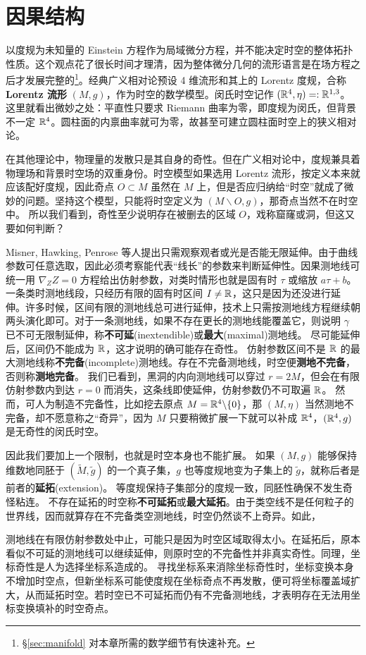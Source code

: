\section{因果结构}\label{sec:causal}

以度规为未知量的 Einstein 方程作为局域微分方程，并不能决定时空的整体拓扑性质。这个观点花了很长时间才理清，因为整体微分几何的流形语言是在场方程之后才发展完整的\footnote{\S\ref{sec:manifold} 对本章所需的数学细节有快速补充。}。经典广义相对论预设 4 维流形和其上的 Lorentz 度规，合称\textbf{Lorentz 流形} $(M,g)$，作为时空的数学模型。闵氏时空记作 $(\mathbb{R}^4,\eta)=:\mathbb{R}^{1,3}$。
这里就看出微妙之处：平直性只要求 Riemann 曲率为零，即度规为闵氏，但背景不一定 $\mathbb{R}^4$。圆柱面的内禀曲率就可为零，故甚至可建立圆柱面时空上的狭义相对论。

在其他理论中，物理量的发散只是其自身的奇性。但在广义相对论中，度规兼具着物理场和背景时空场的双重身份。时空模型如果选用 Lorentz 流形，按定义本来就应该配好度规，因此奇点 $O\subset M$ 虽然在 $M$ 上，但是否应归纳给“时空”就成了微妙的问题。坚持这个模型，只能将时空定义为 $(M\backslash O,g)$，那奇点当然不在时空中。
所以我们看到，奇性至少说明存在被删去的区域 $O$，戏称窟窿或洞，但这又要如何判断？

Misner, Hawking, Penrose 等人提出只需观察观者或光是否能无限延伸。由于曲线参数可任意选取，因此必须考察能代表“线长”的参数来判断延伸性。因果测地线可统一用 $\nabla_Z Z = 0$ 方程给出仿射参数，对类时情形也就是固有时 $\tau$ 或缩放 $a\tau + b$。
一条类时测地线段，只经历有限的固有时区间 $I\ne \mathbb{R}$，这只是因为还没进行延伸。许多时候，区间有限的测地线总可进行延伸，技术上只需按测地线方程继续朝两头演化即可。对于一条测地线，如果不存在更长的测地线能覆盖它，则说明 $\gamma$ 已不可无限制延伸，称\textbf{不可延}(inextendible)或\textbf{最大}(maximal)测地线。
尽可能延伸后，区间仍不能成为 $\mathbb{R}$，这才说明的确可能存在奇性。
仿射参数区间不是 $\mathbb{R}$ 的最大测地线称\textbf{不完备}(incomplete)测地线。存在不完备测地线，时空便\textbf{测地不完备}，否则称\textbf{测地完备}。
我们已看到，黑洞的内向测地线可以穿过 $r=2M$，但会在有限仿射参数内到达 $r=0$ 而消失，这条线即使延伸，仿射参数仍不可取遍 $\mathbb{R}$。
然而，可人为制造不完备性，比如挖去原点 $M=\mathbb{R}^4\backslash\{0\}$，那 $(M,\eta)$ 当然测地不完备，却不愿意称之“奇异”，因为 $M$ 只要稍微扩展一下就可以补成 $\mathbb{R}^4$，$(\mathbb{R}^4,g)$ 是无奇性的闵氏时空。

因此我们要加上一个限制，也就是时空本身也不能扩展。
如果 $(M,g)$ 能够保持维数地同胚于 $(\widetilde{M},\tilde g)$ 的一个真子集，$g$ 也等度规地变为子集上的 $\tilde g$，就称后者是前者的\textbf{延拓}(extension)。
等度规保持子集部分的度规一致，同胚性确保不发生奇怪粘连。
不存在延拓的时空称\textbf{不可延拓}或\textbf{最大延拓}。由于类空线不是任何粒子的世界线，因而就算存在不完备类空测地线，时空仍然谈不上奇异。如此，
\begin{center}
\end{center}
测地线在有限仿射参数处中止，可能只是因为时空区域取得太小。在延拓后，原本看似不可延的测地线可以继续延伸，则原时空的不完备性并非真实奇性。同理，坐标奇性是人为选择坐标系造成的。
寻找坐标系来消除坐标奇性时，坐标变换本身不增加时空点，但新坐标系可能使度规在坐标奇点不再发散，便可将坐标覆盖域扩大，从而延拓时空。若时空已不可延拓而仍有不完备测地线，才表明存在无法用坐标变换填补的时空奇点。


